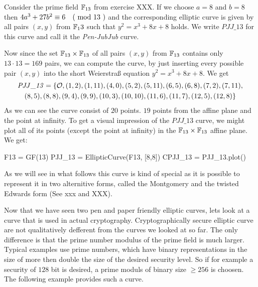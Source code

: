 \begin{example} Consider the prime field $\mathbb{F}_{13}$ from exercise XXX. If we choose $a=8$ and $b=8$ then $4a^3+ 27b^2 \equiv 6 \quad \text{( mod } 13 \text{ )}$ and the corresponding elliptic curve is given by all pairs $(x,y)$ from $\mathbb{F}_13$ such that $y^2=x^3+8x+8$ holds. We write $\mathit{PJJ\_13}$ for this curve and call it the \textit{Pen-JubJub} curve.

Now since the set $\mathbb{F}_{13}\times \mathbb{F}_{13}$ of all pairs $(x,y)$ from $\mathbb{F}_{13}$ contains only $13\cdot 13=169$ pairs, we can compute the curve, by just inserting every possible pair $(x,y)$ into the short Weierstraß equation $y^2 = x^3 +8x +8$.  We get
\begin{multline*}
\mathit{PJJ\_13} = \{\mathcal{O}, (1, 2), (1, 11), (4, 0), (5, 2), (5, 11), (6, 5), (6, 8), (7,2), (7, 11), \\ (8, 5), (8, 8), (9, 4), (9, 9), (10, 3), (10,
10), (11, 6), (11, 7), (12, 5), (12, 8)\}
\end{multline*}
As we can see the curve consist of $20$ points. $19$ points from the affine plane and the point at infinity.
To get a visual impression of the $\mathit{PJJ\_13}$ curve, we might plot all of its points (except the point at infinity) in the $\mathbb{F}_{13}\times \mathbb{F}_{13}$ affine plane. We get:
\begin{sagesilent}
F13 = GF(13)
PJJ_13 = EllipticCurve(F13, [8,8])
CPJJ_13 = PJJ_13.plot()
\end{sagesilent}
\begin{center}
\end{center}
As we will see in what follows this curve is kind of special as it is possible to represent it in two alternitive forms, called the Montgomery and the twisted Edwards form (See xxx and XXX).
\end{example}
Now that we have seen two pen and paper friendly elliptic curves, lets look at a curve that is used in actual cryptography. Cryptographically secure elliptic curve are not qualitatively defferent from the curves we looked at so far. The only difference is that the prime number modulus of the prime field is much larger. Typical examples use prime numbers, which have binary representations in the size of more then double the size of the desired security level. So if for example a security of $128$ bit is desired, a prime moduls of binary size $\geq 256$ is choosen. The following example provides such a curve.
